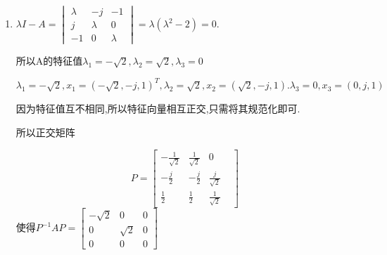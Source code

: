\documentclass[11pt,letterpaper]{ctexart}
\begin{document}
\begin{enumerate}
\begin{enumerate}
	\item $\lambda I - A = \begin{vmatrix}
		\lambda & -j & -1 \\
		j & \lambda & 0 \\
		-1 & 0 & \lambda
	\end{vmatrix} = \lambda(\lambda^2 - 2) = 0$.

	所以A的特征值$\lambda_1 = - \sqrt{2}, \lambda_2 = \sqrt{2}, \lambda_3 = 0$

	$\lambda_1 = -\sqrt{2}, x_1 = (-\sqrt{2}, -j,1)^T,\lambda_2 = \sqrt{2}, x_2 = (\sqrt{2}, -j, 1). \lambda_3 = 0, x_3 = (0, j, 1)$

	因为特征值互不相同,所以特征向量相互正交,只需将其规范化即可.

	所以正交矩阵

	$$ P = \begin{bmatrix}
		-\frac{1}{\sqrt{2}} & \frac{1}{\sqrt{2}} & 0 & \\
		-\frac{j}{2} & -\frac{j}{2} & \frac{j}{\sqrt{2}} & \\
		\frac{1}{2} & \frac{1}{2} & \frac{1}{\sqrt{2}}
	\end{bmatrix}$$使得$P^{-1}AP = \begin{bmatrix}
		-\sqrt{2} & 0 & 0 \\
		0 & \sqrt{2} & 0 \\
		0 & 0 & 0
	\end{bmatrix}$
	
\end{enumerate}











\end{enumerate}
\end{document}
